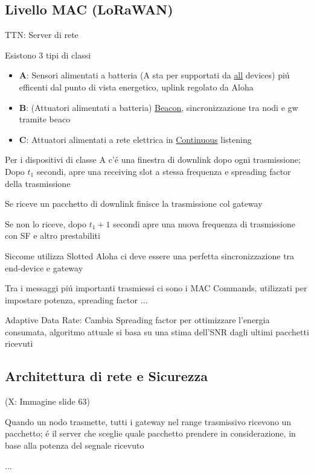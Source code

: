 \documentclass{article}
\begin{document}
\subsection{Livello MAC (LoRaWAN)}
TTN: Server di rete

Esistono 3 tipi di classi
\begin{itemize}
    \item \textbf{A}: Sensori alimentati a batteria (A sta per supportati da \underline{all} devices) pi\'u efficenti dal punto di vista energetico, uplink regolato da Aloha
    \item \textbf{B}: (Attuatori alimentati a batteria) \underline{Beacon}, sincronizzazione tra nodi e gw tramite beaco
    \item \textbf{C}: Attuatori alimentati a rete elettrica in \underline{Continuous} listening
\end{itemize}

Per i dispositivi di classe A c'\'e una finestra di downlink dopo ogni trasmissione; Dopo $t_1$ secondi, apre una receiving slot a stessa frequenza e spreading factor della trasmissione

Se riceve un pacchetto di downlink finisce la trasmissione col gateway

Se non lo riceve, dopo $t_1 + 1$ secondi apre una nuova frequenza di trasmissione con SF e altro prestabiliti

Siccome utilizza Slotted Aloha ci deve essere una perfetta sincronizzazione tra end-device e gateway

Tra i messaggi pi\'u importanti trasmiessi ci sono i MAC Commands, utilizzati per impostare potenza, spreading factor $\ldots$


Adaptive Data Rate: Cambia Spreading factor per ottimizzare l'energia consumata, algoritmo attuale si basa su una stima dell'SNR dagli ultimi pacchetti ricevuti

\subsection{Architettura di rete e Sicurezza}
\begin{center}
(X: Immagine slide 63)
\end{center}

Quando un nodo trasmette, tutti i gateway nel range trasmissivo ricevono un pacchetto; \'e il server che sceglie quale pacchetto prendere in considerazione, in base alla potenza del segnale ricevuto

$\ldots$
\end{document}

